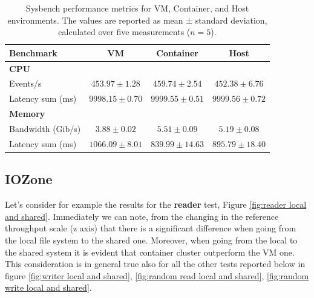 \begin{table}[htbp]
    \centering
    \begin{tabular}{lccc}
    \toprule
    \textbf{Benchmark} & \textbf{VM} & \textbf{Container} & \textbf{Host} \\
    \midrule
    \textbf{CPU} & & & \\
    Events/s & $453.97 \pm 1.28$ & $459.74 \pm 2.54$ & $452.38 \pm 6.76$ \\
    Latency sum (ms) & $9998.15 \pm 0.70$ & $9999.55 \pm 0.51$ & $9999.56 \pm 0.72$ \\
    \midrule
    \textbf{Memory} & & & \\
    Bandwidth (Gib/s) & $3.88 \pm 0.02$ & $5.51 \pm 0.09$ & $5.19 \pm 0.08$ \\
    Latency sum (ms) & $1066.09 \pm 8.01$ & $839.99 \pm 14.63$ & $895.79 \pm 18.40$ \\
    \bottomrule

    \end{tabular}
    \caption{Sysbench performance metrics for VM, Container, and Host environments. The values are reported as mean ± standard deviation, calculated over five measurements ($n = 5$).}
    \label{tab:sysbench}
\end{table}


\subsection{IOZone}


Let's consider for example the results for the \textbf{reader} test, Figure \ref{fig:reader local and shared}. Immediately we can note, from the changing in the reference throughput scale (z axis) that there is a significant difference when going from the local file system to the shared one. Moreover, when going from the local to the shared system it is evident that container cluster outperform the VM one. This consideration is in general true also for all the other tests reported below in figure \ref{fig:writer local and shared}, \ref{fig:random read local and shared}, \ref{fig:random write local and shared}.

